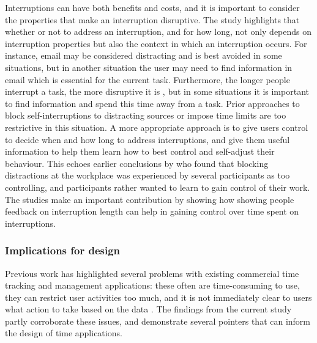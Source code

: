 Interruptions can have both benefits and costs, and it is important to consider the properties that make an interruption disruptive. The study highlights that whether or not to address an interruption, and for how long, not only depends on interruption properties but also the context in which an interruption occurs. For instance, email may be considered distracting and is best avoided in some situations, but in another situation the user may need to find information in email which is essential for the current task. Furthermore, the longer people interrupt a task, the more disruptive it is \citep{Altmann2017, Monk2008}, but in some situations it is important to find information and spend this time away from a task. Prior approaches to block self-interruptions to distracting sources \citep{Kim2017, Mark2018} or impose time limits \citep{Freedom} are too restrictive in this situation. A more appropriate approach is to give users control to decide when and how long to address interruptions, and give them useful information to help them learn how to best control and self-adjust their behaviour. This echoes earlier conclusions by \citet{Mark2018} who found that blocking distractions at the workplace was experienced by several participants as too controlling, and participants rather wanted to learn to gain control of their work. The studies make an important contribution by showing how showing people feedback on interruption length can help in gaining control over time spent on interruptions. 

\subsubsection{Implications for design}
Previous work has highlighted several problems with existing commercial time tracking and management applications: these often are time-consuming to use, they can restrict user activities too much, and it is not immediately clear to users what action to take based on the data \citep{Collins2014, Whittaker2016}. The findings from the current study partly corroborate these issues, and demonstrate several pointers that can inform the design of time applications. 

